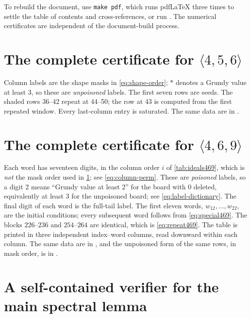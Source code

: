 \documentclass[11pt,letterpaper]{article}
\numberwithin{equation}{section}
\theoremstyle{definition}
\theoremstyle{remark}
\newcommand{\sat}{\ast}
\begin{document}
To rebuild the document, use \texttt{make pdf}, which runs pdf\LaTeX{}
three times to settle the table of contents and cross-references, or run
. The numerical certificates are independent of the
document-build process.

\appendix
\clearpage
\section{The complete certificate for
 \texorpdfstring{$\langle4,5,6\rangle$}{<4,5,6>}}\label{app:table}

Column labels are the shape masks in \cref{eq:shape-order};
$\sat$ denotes a Grundy value at least 3, so these are
\emph{unpoisoned} labels. The first seven rows are
seeds. The shaded rows 36--42 repeat at 44--50; the row at 43 is
computed from the first repeated window. Every last-column entry
is saturated. The same data are in .

\begin{center}

\end{center}

\clearpage
\section{The complete certificate for
 \texorpdfstring{$\langle4,6,9\rangle$}{<4,6,9>}}\label{app:certificate469}

Each word has seventeen digits, in the column order $i$ of
\cref{tab:ideals469}, which is \emph{not} the mask order used in
\cref{app:table}; see \cref{eq:column-perm}. These are \emph{poisoned}
labels, so a digit 2 means ``Grundy value at least 2'' for the board with
0 deleted, equivalently at least 3 for the unpoisoned board; see
\cref{eq:label-dictionary}. The final digit of each word is the full-tail
label. The first eleven words, $w_{12},\ldots,w_{22}$, are the initial
conditions; every subsequent word follows from \cref{eq:special469}. The
blocks $226$--$236$ and $254$--$264$ are identical, which is
\cref{eq:repeat469}. The table is printed in three independent
index--word columns, read downward within each column. The same data are
in , and the unpoisoned form of the
same rows, in mask order, is in .



\clearpage
\section{A self-contained verifier for the main spectral lemma}
\label{app:code}
\end{document}
